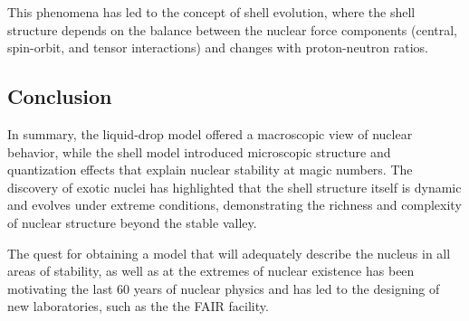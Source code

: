 This phenomena has led to the concept of shell evolution, where the shell structure depends on the balance between the nuclear force components (central, spin-orbit, and tensor interactions) and changes with proton-neutron ratios.

\subsection{Conclusion}

In summary, the liquid-drop model offered a macroscopic view of nuclear behavior, while the shell model introduced microscopic structure and quantization effects that explain nuclear stability at magic numbers. The discovery of exotic nuclei has highlighted that the shell structure itself is dynamic and evolves under extreme conditions, demonstrating the richness and complexity of nuclear structure beyond the stable valley.

The quest for obtaining a model that will adequately describe the nucleus in all areas of stability, as well as at the extremes of nuclear existence has been motivating the last 60 years of nuclear physics and has led to the designing of new laboratories, such as the the FAIR facility.

%
%

%
%
%
%
%
%
%
